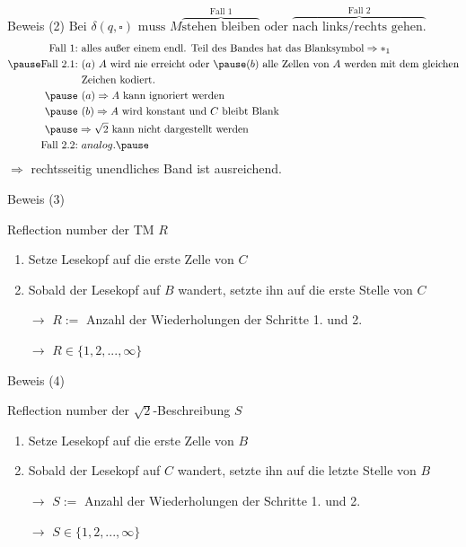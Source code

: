 \documentclass[aspectratio=169]{beamer}
\begin{document}
\begin{frame}{Beweis (2)}
$\text{Bei } \delta(q, \square) \text{ muss } M \overbrace{\text{stehen bleiben}}^{\text{Fall 1}} \text{ oder } \overbrace{\text{nach links/rechts gehen.}}^{\text{Fall 2}}$ \pause
\begin{align*}
\text{Fall 1:} &\ \text{alles außer einem endl. Teil des Bandes hat das Blanksymbol}\Rightarrow *_{1} \\ \pause
\text{Fall 2.1:} &\ (a)\ A \text{ wird nie erreicht oder }\pause (b) \text{ alle Zellen von } A \text{ werden mit dem gleichen} \\ &\text{ Zeichen kodiert.}\\\pause
&\ (a)\Rightarrow A \text{ kann ignoriert werden}\\ \pause
&\ (b)\Rightarrow A \text{ wird konstant und } C \text{ bleibt Blank}\\ \pause
& \Rightarrow \sqrt{2} \text{ kann nicht dargestellt werden} \\
\text{Fall 2.2:} &\ analog.\pause
\end{align*}
$\Rightarrow$ rechtsseitig unendliches Band ist ausreichend.
\end{frame}

\begin{frame}{Beweis (3)}
\begin{block}{Reflection number der TM $R$} \pause
\begin{enumerate}
\item Setze Lesekopf auf die erste Zelle von $C$ \pause
\item Sobald der Lesekopf auf $B$ wandert, setzte ihn auf die erste Stelle von $C$ \pause
\item[$\rightarrow$] $R:=$ Anzahl der Wiederholungen der Schritte 1. und 2. \pause
\item[$\rightarrow$] $R \in \{1,2,...,\infty\}$
\end{enumerate}
\end{block}
\end{frame}

\begin{frame}{Beweis (4)}
\begin{block}{Reflection number der $\sqrt{2}$-Beschreibung $S$} \pause
\begin{enumerate}
\item Setze Lesekopf auf die erste Zelle von $B$ \pause
\item Sobald der Lesekopf auf $C$ wandert, setzte ihn auf die letzte Stelle von $B$ \pause
\item[$\rightarrow$] $S:=$ Anzahl der Wiederholungen der Schritte 1. und 2. \pause
\item[$\rightarrow$] $S \in \{1,2,...,\infty\}$ 
\end{enumerate}
\end{block}
\end{frame}
\end{document}
